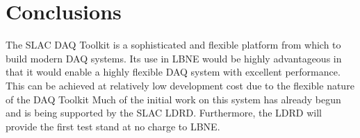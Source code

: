 \section{Conclusions}
The SLAC DAQ Toolkit is a sophisticated and flexible platform from which
to build modern DAQ systems.
Its use in LBNE would be highly advantageous in that it would enable a highly 
flexible DAQ system with excellent performance.
This can be achieved at relatively low development cost due to the flexible 
nature of the DAQ Toolkit 
Much of the initial work on this system has already begun and is being 
supported by the SLAC LDRD.
Furthermore, the LDRD will provide the first test stand at no charge to LBNE.